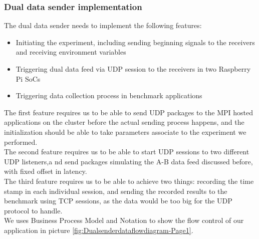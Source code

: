 \documentclass[11pt,openright,a4paper]{report}
\begin{document}
\subsubsection{Dual data sender implementation}
The dual data sender needs to implement the following features:
\begin{itemize}
	\item Initiating the experiment, including sending beginning signals to the receivers and receiving environment variables
	\item Triggering dual data feed via UDP session to the receivers in two Raspberry Pi SoCs
	\item Triggering data collection process in benchmark applications
\end{itemize}
The first feature requires us to be able to send UDP packages to the MPI hosted applications on the cluster before the actual sending process happens, and the initialization should be able to take parameters associate to the experiment we performed. \\
The second feature requires us to be able to start UDP sessions to two different UDP listeners,a nd send packages simulating the A-B data feed discussed before, with fixed offset in latency.\\
The third feature requires us to be able to achieve two things: recording the time stamp in each individual session, and sending the recorded results to the benchmark using TCP sessions, as the data would be too big for the UDP protocol to handle.\\
We uses Business Process Model and Notation to show the flow control of our application\cite{dijkman2011business} in picture \ref{fig:Dualsenderdataflowdiagram-Page1}.
\end{document}
